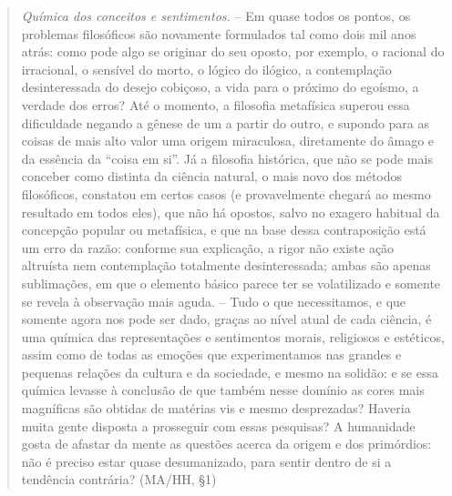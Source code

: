 \documentclass[
	12pt,				%
	openright,			%
	oneside,			%
	a4paper,			%
	english,			%
	french,				%
	spanish,			%
	brazil				%
	]{abntex2}
\begin{document}
\begin{quotation}
\textit{Química dos conceitos e sentimentos.} – Em quase todos os pontos, os problemas filosóficos são novamente formulados tal como dois mil anos atrás: como pode algo se originar do seu oposto, por exemplo, o racional do irracional, o sensível do morto, o lógico do ilógico, a contemplação desinteressada do desejo cobiçoso, a vida para o próximo do egoísmo, a verdade dos erros? Até o momento, a filosofia metafísica superou essa dificuldade negando a gênese de um a partir do outro, e supondo para as coisas de mais alto valor uma origem miraculosa, diretamente do âmago e da essência da “coisa em si”. Já a filosofia histórica, que não se pode mais conceber como distinta da ciência natural, o mais novo dos métodos filosóficos, constatou em certos casos (e provavelmente chegará ao mesmo resultado em todos eles), que não há opostos, salvo no exagero habitual da concepção popular ou metafísica, e que na base dessa contraposição está um erro da razão: conforme sua explicação, a rigor não existe ação altruísta nem contemplação totalmente desinteressada; ambas são apenas sublimações, em que o elemento básico parece ter se volatilizado e somente se revela à observação mais aguda. – Tudo o que necessitamos, e que somente agora nos pode ser dado, graças ao nível atual de cada ciência, é uma química das representações e sentimentos morais, religiosos e estéticos, assim como de todas as emoções que experimentamos nas grandes e pequenas relações da cultura e da sociedade, e mesmo na solidão: e se essa química levasse à conclusão de que também nesse domínio as cores mais magníficas são obtidas de matérias vis e mesmo desprezadas? Haveria muita gente disposta a prosseguir com essas pesquisas? A humanidade gosta de afastar da mente as questões acerca da origem e dos primórdios: não é preciso estar quase desumanizado, para sentir dentro de si a tendência contrária? (MA/HH, §1)
\end{quotation}
\end{document}
